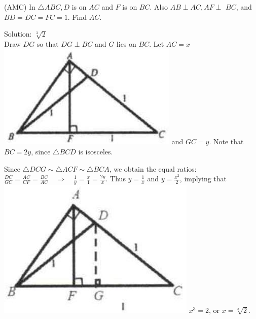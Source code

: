 \documentclass{article}
\begin{document}
(AMC) In \(\triangle A B C, D\) is on \(A C\) and \(F\) is on \(B C\). Also \(A B \perp A C, A F \perp\) \(B C\), and \(B D=D C=F C=1\). Find \(A C\).

Solution: \(\sqrt[3]{2}\)\\
Draw \(D G\) so that \(D G \perp B C\) and \(G\) lies on \(B C\). Let \(A C=x\)\\
\includegraphics[width=\textwidth]{images/079(3).jpg} and \(G C=y\). Note that \(B C=2 y\), since \(\triangle B C D\) is isosceles.


Since \(\triangle D C G \sim \triangle A C F \sim \triangle B C A\), we obtain the equal ratios: \(\frac{D C}{G C}=\frac{A C}{C F}=\frac{B C}{A C} \quad \Rightarrow \quad \frac{1}{y}=\frac{x}{1}=\frac{2 y}{x}\). Thus \(y=\frac{1}{x}\) and \(y=\frac{x^{2}}{2}\), implying that\\
\includegraphics[width=\textwidth]{images/080(2).jpg} \(x^{3}=2\), or \(x=\sqrt[3]{2}\).
\end{document}
